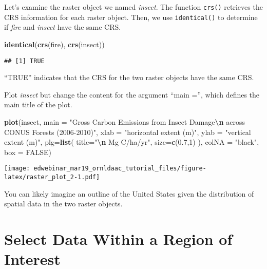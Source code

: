 \documentclass[
]{article}
\newenvironment{Shaded}{\begin{snugshade}}{\end{snugshade}}
\newcommand{\AttributeTok}[1]{\textcolor[rgb]{0.13,0.29,0.53}{#1}}
\newcommand{\ConstantTok}[1]{\textcolor[rgb]{0.56,0.35,0.01}{#1}}
\newcommand{\DecValTok}[1]{\textcolor[rgb]{0.00,0.00,0.81}{#1}}
\newcommand{\FloatTok}[1]{\textcolor[rgb]{0.00,0.00,0.81}{#1}}
\newcommand{\FunctionTok}[1]{\textcolor[rgb]{0.13,0.29,0.53}{\textbf{#1}}}
\newcommand{\NormalTok}[1]{#1}
\newcommand{\SpecialCharTok}[1]{\textcolor[rgb]{0.81,0.36,0.00}{\textbf{#1}}}
\newcommand{\StringTok}[1]{\textcolor[rgb]{0.31,0.60,0.02}{#1}}
\begin{document}
Let's examine the raster object we named \emph{insect}. The function
\texttt{crs()} retrieves the CRS information for each raster object.
Then, we use \texttt{identical()} to determine if \emph{fire} and
\emph{insect} have the same CRS.

\begin{Shaded}
\begin{Highlighting}[]
\FunctionTok{identical}\NormalTok{(}\FunctionTok{crs}\NormalTok{(fire), }\FunctionTok{crs}\NormalTok{(insect)) }
\end{Highlighting}
\end{Shaded}

\begin{verbatim}
## [1] TRUE
\end{verbatim}

``TRUE'' indicates that the CRS for the two raster objects have the same
CRS.

Plot \emph{insect} but change the content for the argument ``main ='',
which defines the main title of the plot.

\begin{Shaded}
\begin{Highlighting}[]
\FunctionTok{plot}\NormalTok{(insect, }
     \AttributeTok{main =} \StringTok{"Gross Carbon Emissions from Insect Damage}\SpecialCharTok{\textbackslash{}n}\StringTok{ across CONUS Forests (2006{-}2010)"}\NormalTok{, }
     \AttributeTok{xlab =} \StringTok{"horizontal extent (m)"}\NormalTok{, }
     \AttributeTok{ylab =} \StringTok{"vertical extent (m)"}\NormalTok{, }
     \AttributeTok{plg=}\FunctionTok{list}\NormalTok{( }\AttributeTok{title=}\StringTok{"}\SpecialCharTok{\textbackslash{}n}\StringTok{      Mg C/ha/yr"}\NormalTok{, }\AttributeTok{size=}\FunctionTok{c}\NormalTok{(}\FloatTok{0.7}\NormalTok{,}\DecValTok{1}\NormalTok{) ), }
     \AttributeTok{colNA =} \StringTok{"black"}\NormalTok{, }
     \AttributeTok{box =} \ConstantTok{FALSE}\NormalTok{) }
\end{Highlighting}
\end{Shaded}

\texttt{[image: edwebinar\_mar19\_ornldaac\_tutorial\_files/figure-latex/raster\_plot\_2-1.pdf]}

You can likely imagine an outline of the United States given the
distribution of spatial data in the two raster objects.

\hypertarget{select-data-within-a-region-of-interest}{%
\section{Select Data Within a Region of
Interest}\label{select-data-within-a-region-of-interest}}
\end{document}
